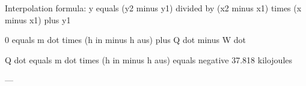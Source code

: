 Interpolation formula:  
y equals (y2 minus y1) divided by (x2 minus x1) times (x minus x1) plus y1  

0 equals m dot times (h in minus h aus) plus Q dot minus W dot  

Q dot equals m dot times (h in minus h aus) equals negative 37.818 kilojoules  

---